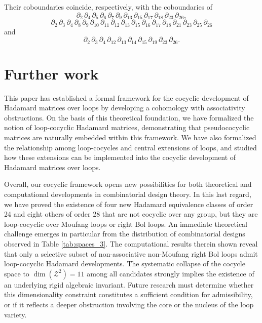 \documentclass[11pt,a4paper]{article}
\begin{document}
Their coboundaries coincide, respectively, with the coboundaries of
\[\partial_2\,\partial_4\,\partial_5\,\partial_6\,\partial_7\,\partial_9\,\partial_{13}\,\partial_{15}\,\partial_{17}\,\partial_{18}\,\partial_{23}\,\partial_{26},\]
\[\partial_2\,\partial_3\,\partial_4\,\partial_8\,\partial_9\,\partial_{10}\,\partial_{11}\,\partial_{12}\,\partial_{13}\,\partial_{15}\,\partial_{16}\,\partial_{17}\,\partial_{18}\,\partial_{21}\,\partial_{23}\,\partial_{25}\,\partial_{26}\]
and
\[\partial_2\,\partial_3\,\partial_4\,\partial_{12}\,\partial_{13}\,\partial_{14}\,\partial_{15}\,\partial_{19}\,\partial_{23}\,\partial_{26}.\]

\section{Further work}

This paper has established a formal framework for the cocyclic development of Hadamard matrices over loops by developing a cohomology with associativity obstructions. On the basis of this theoretical foundation, we have formalized the notion of loop-cocyclic Hadamard matrices, demonstrating that pseudococyclic matrices are naturally embedded within this framework. We have also formalized the relationship among loop-cocycles and central extensions of loops, and studied how these extensions can be implemented into the cocyclic development of Hadamard matrices over loops.

Overall, our cocyclic framework opens new possibilities for both theoretical and computational developments in combinatorial design theory. In this last regard, we have proved the existence of four new Hadamard equivalence classes of order 24 and eight others of order 28 that are not cocyclic over any group, but they are loop-cocyclic over Moufang loops or right Bol loops. An immediate theoretical challenge emerges in particular from the distribution of combinatorial designs observed in Table \ref{tab:spaces_3}. The computational results therein shown reveal that only a selective subset of non-associative non-Moufang right Bol loops admit loop-cocyclic Hadamard developments. The systematic collapse of the cocycle space to $\dim(\mathcal{Z}^2) = 11$ among all candidates strongly implies the existence of an underlying rigid algebraic invariant. Future research must determine whether this dimensionality constraint constitutes a sufficient condition for admissibility, or if it reflects a deeper obstruction involving the core or the nucleus of the loop variety.
\end{document}
